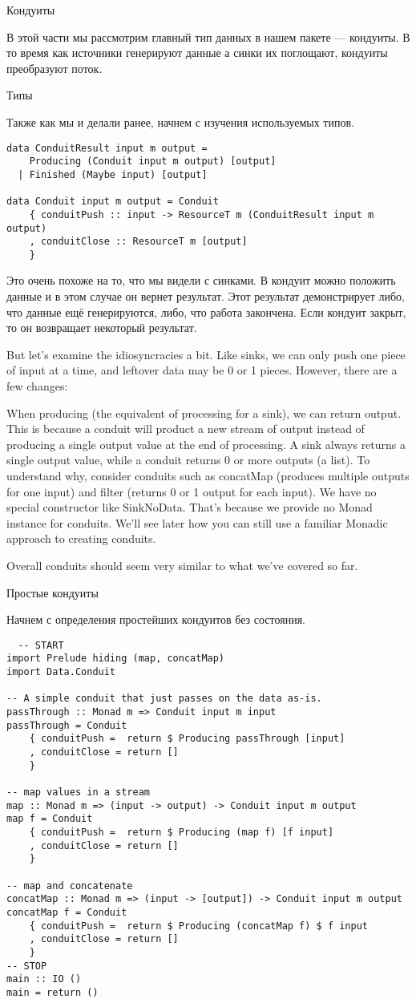 Кондуиты

В этой части мы рассмотрим главный тип данных в нашем пакете --- кондуиты. В то время как
источники генерируют данные а синки их поглощают, кондуиты преобразуют поток.

Типы

Также как мы и делали ранее, начнем с изучения используемых типов.
\begin{lstlisting}
data ConduitResult input m output =
    Producing (Conduit input m output) [output]
  | Finished (Maybe input) [output]

data Conduit input m output = Conduit
    { conduitPush :: input -> ResourceT m (ConduitResult input m output)
    , conduitClose :: ResourceT m [output]
    }
\end{lstlisting}
Это очень похоже на то, что мы видели с синками. В кондуит можно положить данные и в этом
случае он вернет результат. Этот результат демонстрирует либо, что данные ещё
генерируются, либо, что работа закончена. Если кондуит закрыт, то он возвращает некоторый
результат.


But let's examine the idiosyncracies a bit. Like sinks, we can only push one piece of
input at
a time, and leftover data may be 0 or 1 pieces. However, there are a few changes:

  
When producing (the equivalent of processing for a sink), we can return output. This is
because a conduit will product a new stream of output instead of producing a single
output
value
at the end of processing.
A sink always returns a single output value, while a conduit returns 0 or more outputs
(a
list). To understand why, consider conduits such as concatMap (produces
multiple outputs for one input) and filter (returns 0 or 1 output for each
input).
We have no special constructor like SinkNoData. That's because we provide no
Monad instance for conduits. We'll see later how you can still use a familiar
Monadic approach to creating conduits.
  
Overall conduits should seem very similar to what we've covered so far.

Простые кондуиты

Начнем с определения простейших кондуитов без состояния.
\begin{lstlisting}
  -- START
import Prelude hiding (map, concatMap)
import Data.Conduit

-- A simple conduit that just passes on the data as-is.
passThrough :: Monad m => Conduit input m input
passThrough = Conduit
    { conduitPush =  return $ Producing passThrough [input]
    , conduitClose = return []
    }

-- map values in a stream
map :: Monad m => (input -> output) -> Conduit input m output
map f = Conduit
    { conduitPush =  return $ Producing (map f) [f input]
    , conduitClose = return []
    }

-- map and concatenate
concatMap :: Monad m => (input -> [output]) -> Conduit input m output
concatMap f = Conduit
    { conduitPush =  return $ Producing (concatMap f) $ f input
    , conduitClose = return []
    }
-- STOP
main :: IO ()
main = return ()
\end{lstlisting}

